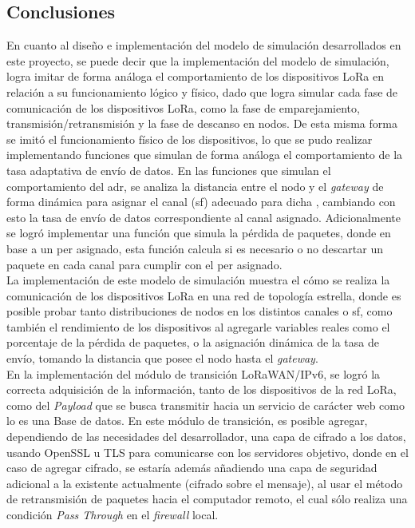 \begin{justify}
\chapter{Conclusiones}
En cuanto al diseño e implementación del modelo de simulación desarrollados en este proyecto, se puede decir que la implementación del modelo de simulación, logra imitar de forma análoga el comportamiento de los dispositivos LoRa en relación a su funcionamiento lógico y físico, dado que logra simular cada fase de comunicación de los dispositivos LoRa, como la fase de emparejamiento, transmisión/retransmisión y la fase de descanso en nodos. De esta misma forma se imitó el funcionamiento físico de los dispositivos, lo que se pudo realizar implementando funciones que simulan de forma análoga el comportamiento de la tasa adaptativa de envío de datos. En las funciones que simulan el comportamiento del \gls{adr}, se analiza la distancia entre el nodo y el \textit{gateway} de forma dinámica para asignar el canal (\gls{sf}) adecuado para dicha , cambiando con esto la tasa de envío de datos correspondiente al canal asignado. Adicionalmente se logró implementar una función que simula la pérdida de paquetes, donde en base a un \gls{per} asignado, esta función calcula si es necesario o no descartar un paquete en cada canal para cumplir con el \gls{per} asignado.\\
La implementación de este modelo de simulación muestra el cómo se realiza la comunicación de los dispositivos LoRa en una red de topología estrella, donde es posible probar tanto distribuciones de nodos en los distintos canales o \gls{sf}, como también el rendimiento de los dispositivos al agregarle variables reales como el porcentaje de la pérdida de paquetes, o la asignación dinámica de la tasa de envío, tomando la distancia que posee el nodo hasta el \textit{gateway}.\\
En la implementación del módulo de transición LoRaWAN/IPv6, se logró la correcta adquisición de la información, tanto de los dispositivos de la red LoRa, como del \textit{Payload} que se busca transmitir hacia un servicio de carácter web como lo es una Base de datos. En este módulo de transición, es posible agregar, dependiendo de las necesidades del desarrollador, una capa de cifrado a los datos, usando OpenSSL u TLS para comunicarse con los servidores objetivo, donde en el caso de agregar cifrado, se estaría además añadiendo una capa de seguridad adicional a la existente actualmente (cifrado sobre el mensaje), al usar el método de retransmisión de paquetes hacia el computador remoto, el cual sólo realiza una condición \textit{Pass Through} en el \textit{firewall} local.\\

\end{justify}

